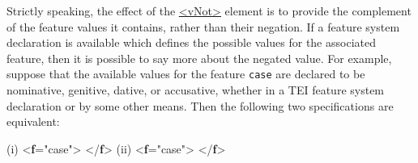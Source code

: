 Strictly speaking, the effect of the \hyperref[TEI.vNot]{<vNot>} element is to provide the complement of the feature values it contains, rather than their negation. If a feature system declaration is available which defines the possible values for the associated feature, then it is possible to say more about the negated value. For example, suppose that the available values for the feature \texttt{case} are declared to be nominative, genitive, dative, or accusative, whether in a TEI feature system declaration or by some other means. Then the following two specifications are equivalent: \par\bgroup{}\exampleFont \begin{shaded}\noindent\mbox{} (i) {<\textbf{f}\hspace*{1em}{name}="{case}">}\mbox{}\newline 
{}\mbox{}\newline 
\hspace*{1em}\mbox{}\newline 
{}\mbox{}\newline 
{</\textbf{f}>}\mbox{}\newline 
 (ii) \mbox{}\newline 
{<\textbf{f}\hspace*{1em}{name}="{case}">}\mbox{}\newline 
{}\mbox{}\newline 
\hspace*{1em}\mbox{}\newline 
\hspace*{1em}\mbox{}\newline 
\hspace*{1em}\mbox{}\newline 
{}\mbox{}\newline 
{</\textbf{f}>}\end{shaded}\egroup\par \par
